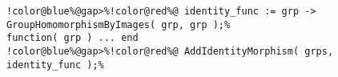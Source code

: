 \begin{Verbatim}[commandchars=!@\%,frame=single]
!color@blue%@gap>%!color@red%@ identity_func := grp -> GroupHomomorphismByImages( grp, grp );%
function( grp ) ... end
!color@blue%@gap>%!color@red%@ AddIdentityMorphism( grps, identity_func );%
\end{Verbatim}

